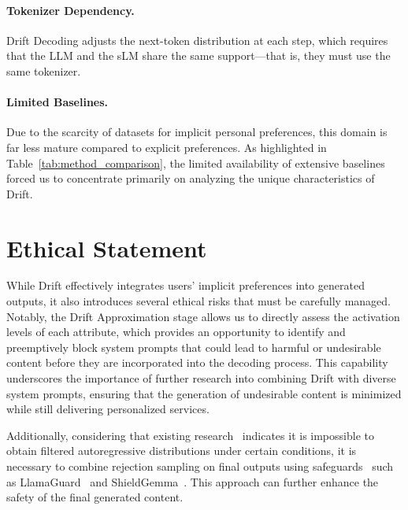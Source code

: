 \paragraph{Tokenizer Dependency.}  
Drift Decoding adjusts the next-token distribution at each step, which requires that the LLM and the sLM share the same support—that is, they must use the same tokenizer. 

\paragraph{Limited Baselines.}  
Due to the scarcity of datasets for implicit personal preferences, this domain is far less mature compared to explicit preferences. As highlighted in Table~\ref{tab:method_comparison}, the limited availability of extensive baselines forced us to concentrate primarily on analyzing the unique characteristics of Drift.

\section*{Ethical Statement}

While Drift effectively integrates users’ implicit preferences into generated outputs, it also introduces several ethical risks that must be carefully managed. Notably, the Drift Approximation stage allows us to directly assess the activation levels of each attribute, which provides an opportunity to identify and preemptively block system prompts that could lead to harmful or undesirable content before they are incorporated into the decoding process. This capability underscores the importance of further research into combining Drift with diverse system prompts, ensuring that the generation of undesirable content is minimized while still delivering personalized services.

Additionally, considering that existing research~\citep{kim2024guaranteed} indicates it is impossible to obtain filtered autoregressive distributions under certain conditions, it is necessary to combine rejection sampling on final outputs using safeguards~\citep{lifetox} such as LlamaGuard~\citep{llamaguard} and ShieldGemma~\citep{shieldgemma}. This approach can further enhance the safety of the final generated content.

